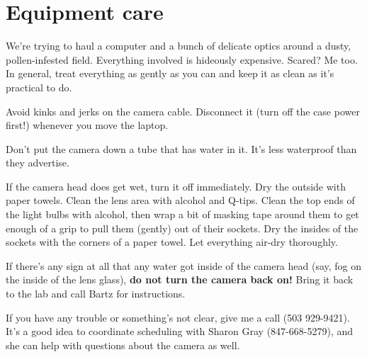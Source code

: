 \documentclass[11pt]{article}
\begin{document}
\section{Equipment care}
	We're trying to haul a computer and a bunch of delicate optics around a dusty, pollen-infested field. Everything involved is hideously expensive. Scared? Me too. In general, treat everything as gently as you can and keep it as clean as it's practical to do.
	
	Avoid kinks and jerks on the camera cable. Disconnect it (turn off the case power first!) whenever you move the laptop.
	
	Don't put the camera down a tube that has water in it. It's less waterproof than they advertise. 
	
	If the camera head does get wet, turn it off immediately. Dry the outside with paper towels. Clean the lens area with alcohol and Q-tips. Clean the top ends of the light bulbs with alcohol, then wrap a bit of masking tape around them to get enough of a grip to pull them (gently) out of their sockets. Dry the insides of the sockets with the corners of a paper towel. Let everything air-dry thoroughly.
	
	If there's any sign at all that any water got inside of the camera head (say, fog on the inside of the lens glass), \textbf{do not turn the camera back on!} Bring it back to the lab and call Bartz for instructions.
	
	
If you have any trouble or something's not clear, give me a call (503 929-9421).  It's a good idea to coordinate scheduling with Sharon Gray (847-668-5279), and she can help with questions about the camera as well.		
\end{document}

